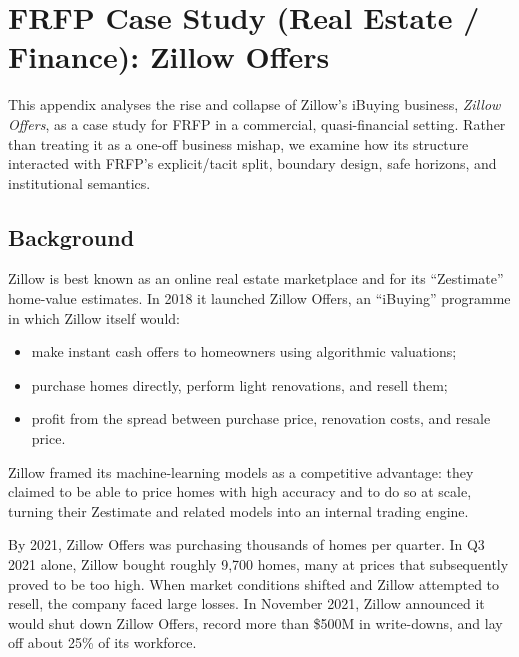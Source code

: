 
\section{FRFP Case Study (Real Estate / Finance): Zillow Offers}
\label{app:frfp-zillow-offers}

This appendix analyses the rise and collapse of Zillow’s iBuying business,
\emph{Zillow Offers}, as a case study for FRFP in a commercial, quasi-financial
setting.
Rather than treating it as a one-off business mishap, we examine how its
structure interacted with FRFP’s explicit/tacit split, boundary design, safe
horizons, and institutional semantics.

\subsection{Background}

Zillow is best known as an online real estate marketplace and for its
``Zestimate'' home-value estimates.
In 2018 it launched Zillow Offers, an ``iBuying'' programme in which Zillow
itself would:

\begin{itemize}
  \item make instant cash offers to homeowners using algorithmic valuations;
  \item purchase homes directly, perform light renovations, and resell them;
  \item profit from the spread between purchase price, renovation costs,
        and resale price.
\end{itemize}

Zillow framed its machine-learning models as a competitive advantage:
they claimed to be able to price homes with high accuracy and to do so at
scale, turning their Zestimate and related models into an internal
trading engine.

By 2021, Zillow Offers was purchasing thousands of homes per quarter.
In Q3 2021 alone, Zillow bought roughly 9,700 homes, many at prices that
subsequently proved to be too high.
When market conditions shifted and Zillow attempted to resell, the company
faced large losses.
In November 2021, Zillow announced it would shut down Zillow Offers, record
more than \$500M in write-downs, and lay off about 25\% of its workforce.

